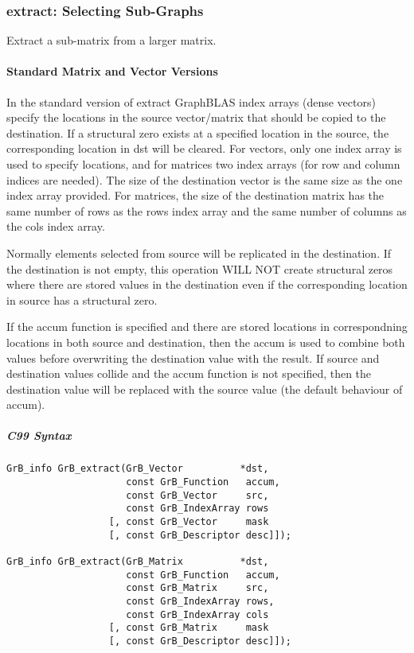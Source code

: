 \subsubsection{{\sf extract}: Selecting Sub-Graphs}

Extract a sub-matrix from a larger matrix. 

\paragraph{Standard Matrix and Vector Versions}

In the standard version of {\sf extract} GraphBLAS index arrays (dense vectors)
specify the locations in the source vector/matrix that should be copied to the
destination.  If a structural zero exists at a specified location in the source,
the corresponding location in dst will be cleared.  For vectors, only one index array is used to specify
locations, and for matrices two index arrays (for row and column indices are needed).
The size of the destination vector is the same size as the one index array provided.
For matrices, the size of the destination matrix has the same number of rows as the
{\sf rows} index array and the same number of columns as the {\sf cols} index array.

Normally elements selected from source will be replicated in the destination.  If the
destination is not empty, this operation WILL NOT create structural zeros where there
are stored values in the destination even if the corresponding location in source has
a structural zero.

If the {\sf accum} function is specified and there are stored locations in correspondning
locations in both source and destination, then the
{\sf accum} is used to combine both values before overwriting the destination value
with the result.  If source and destination values collide and the {\sf accum} function is
not specified, then the destination value will be replaced with the source value (the
default behaviour of {\sf accum}).

\subparagraph{C99 Syntax}

\begin{verbatim}
GrB_info GrB_extract(GrB_Vector          *dst,
                     const GrB_Function   accum,
                     const GrB_Vector     src,
                     const GrB_IndexArray rows
                  [, const GrB_Vector     mask
                  [, const GrB_Descriptor desc]]);
                  
GrB_info GrB_extract(GrB_Matrix          *dst,
                     const GrB_Function   accum,
                     const GrB_Matrix     src,
                     const GrB_IndexArray rows,
                     const GrB_IndexArray cols
                  [, const GrB_Matrix     mask
                  [, const GrB_Descriptor desc]]);
\end{verbatim}

